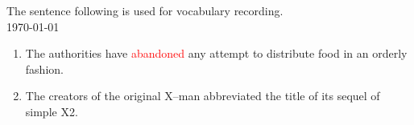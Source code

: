 \documentclass[utf8]{article}
\begin{document}
\begin{flushright}
The sentence following is used for vocabulary recording.\\ 
\today\\
\end{flushright}
\begin{enumerate}
\item The authorities have \textcolor{red}{abandoned} any attempt to distribute food in an orderly fashion.
\item The creators of the original X--man abbreviated the title of its sequel of simple X2.
\end{enumerate}
\end{document}
